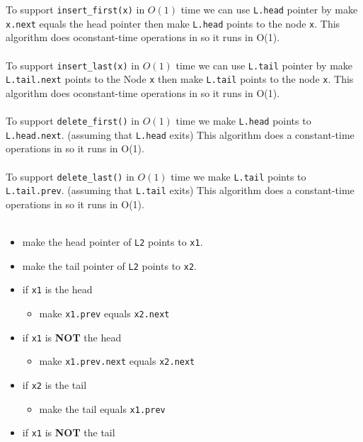 \documentclass[12pt,twoside]{article}
\begin{document}
\begin{problems}
\begin{problemparts}
\problempart %
  To support {\tt insert\_first(x)} in $O(1)$ time we can use {\tt L.head} pointer by make {\tt x.next} equals the 
  head pointer then make {\tt L.head} points to the node {\tt x}. 
  This algorithm does oconstant-time operations in so it runs in O(1). \\ 
  \\
  To support {\tt insert\_last(x)} in $O(1)$ time we can use {\tt L.tail} pointer by make {\tt L.tail.next} points 
  to the Node {\tt x} then make {\tt L.tail} points to the node {\tt x}.
  This algorithm does oconstant-time operations in so it runs in O(1). \\
  \\
  To support {\tt delete\_first()} in $O(1)$ time we make {\tt L.head} points to {\tt L.head.next}. 
  (assuming that {\tt L.head} exits) 
  This algorithm does a constant-time operations in so it runs in O(1). \\
  \\
  To support {\tt delete\_last()} in $O(1)$ time we make {\tt L.tail} points to {\tt L.tail.prev}.
  (assuming that {\tt L.tail} exits)
  This algorithm does a constant-time operations in so it runs in O(1). \\
  \\
\problempart %
  \begin{itemize}
    \item make the head pointer of {\tt L2} points to {\tt x1}.
    \item make the tail pointer of {\tt L2} points to {\tt x2}.
    \item if {\tt x1} is the head
      \begin{itemize}
        \item make {\tt x1.prev} equals {\tt x2.next}
      \end{itemize}
    \item if {\tt x1} is \textbf{NOT} the head
      \begin{itemize}
        \item make {\tt x1.prev.next} equals {\tt x2.next}
      \end{itemize}
    \item if {\tt x2} is the tail
      \begin{itemize}
          \item make the tail equals {\tt x1.prev}
      \end{itemize}
    \item if {\tt x1} is \textbf{NOT} the tail

\end{itemize}
\end{problemparts}
\end{problems}
\end{document}
